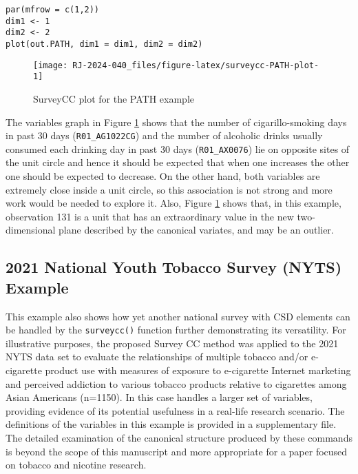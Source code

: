 \begin{verbatim}
par(mfrow = c(1,2))
dim1 <- 1
dim2 <- 2
plot(out.PATH, dim1 = dim1, dim2 = dim2)
\end{verbatim}

\begin{figure}
\texttt{[image: RJ-2024-040\_files/figure-latex/surveycc-PATH-plot-1]} \caption{SurveyCC plot for the PATH example}\label{fig:surveycc-PATH-plot}
\end{figure}

The variables graph in Figure \ref{fig:surveycc-PATH-plot} shows that the number of cigarillo-smoking days in past 30 days (\texttt{R01\_AG1022CG}) and the number of alcoholic drinks usually consumed each drinking day in past 30 days (\texttt{R01\_AX0076}) lie on opposite sites of the unit circle and hence it should be expected that when one increases the other one should be expected to decrease. On the other hand, both variables are extremely close inside a unit circle, so this association is not strong and more work would be needed to explore it. Also, Figure \ref{fig:surveycc-PATH-plot} shows that, in this example, observation 131 is a unit that has an extraordinary value in the new two-dimensional plane described by the canonical variates, and may be an outlier.

\hypertarget{national-youth-tobacco-survey-nyts-example}{%
\subsection{2021 National Youth Tobacco Survey (NYTS) Example}\label{national-youth-tobacco-survey-nyts-example}}

This example also shows how yet another national survey with CSD elements can be handled by the \texttt{surveycc()} function further demonstrating its versatility. For illustrative purposes, the proposed Survey CC method was applied to the 2021 NYTS data set to evaluate the relationships of multiple tobacco and/or e-cigarette product use with measures of exposure to e-cigarette Internet marketing and perceived addiction to various tobacco products relative to cigarettes among Asian Americans (n=1150). In this case  handles a larger set of variables, providing evidence of its potential usefulness in a real-life research scenario. The definitions of the variables in this example is provided in a supplementary file. The detailed examination of the canonical structure produced by these commands is beyond the scope of this manuscript and more appropriate for a paper focused on tobacco and nicotine research.

